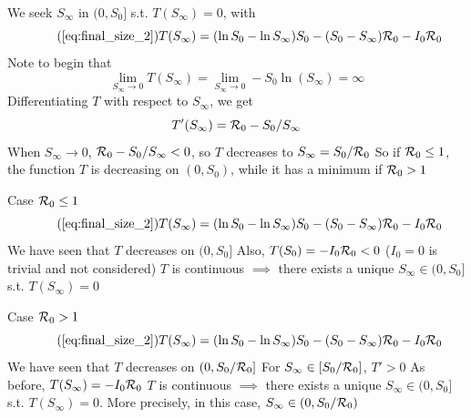 \documentclass[aspectratio=169]{beamer}\usepackage[]{graphicx}\usepackage[]{xcolor}
\begin{document}
\begin{frame}{}
  We seek $S_\infty$ in $(0,S_0]$ s.t. $T(S_\infty)=0$, with
  \begin{equation}\tag{\ref{eq:final_size_2}}
    T(S_\infty) =(\ln S_0-\ln S_\infty)S_0
    - (S_0-S_\infty)\R_0 -I_0\R_0      
  \end{equation}
  \vfill
  Note to begin that 
  $$
  \lim_{S_\infty\to 0}T(S_\infty)=\lim_{S_\infty\to 0}-S_0\ln(S_\infty)=\infty
  $$
  \vfill
  Differentiating $T$ with respect to $S_\infty$, we get 
  $$
  T'(S_\infty)=\mathcal{R}_0-S_0/S_\infty
  $$ 
  \vfill
  When $S_\infty\to 0$, $\mathcal{R}_0-S_0/S_\infty<0$, so $T$ decreases to $S_\infty=S_0/\mathcal{R}_0$
  \vfill
  So if $\mathcal{R}_0\leq 1$, the function $T$ is decreasing on $(0,S_0)$, while it has a minimum if $\mathcal{R}_0>1$
\end{frame}



\begin{frame}{Case $\mathcal{R}_0\leq 1$}
  \begin{equation}\tag{\ref{eq:final_size_2}}
    T(S_\infty) =(\ln S_0-\ln S_\infty)S_0
    - (S_0-S_\infty)\R_0 -I_0\R_0      
  \end{equation}
  \vfill
  \bbullet We have seen that $T$ decreases on $(0,S_0]$
  \vfill
  \bbullet Also, $T(S_0)=-I_0\mathcal{R}_0<0$ ($I_0=0$ is trivial and not considered)
  \vfill
  \bbullet $T$ is continuous
  \vfill
  $\implies$ there exists a unique $S_\infty\in (0,S_0]$ s.t. $T(S_\infty)=0$
\end{frame}


\begin{frame}{Case $\mathcal{R}_0> 1$}
  \begin{equation}\tag{\ref{eq:final_size_2}}
    T(S_\infty) =(\ln S_0-\ln S_\infty)S_0
    - (S_0-S_\infty)\R_0 -I_0\R_0      
  \end{equation}
  \vfill
  \bbullet We have seen that $T$ decreases on $(0,S_0/\mathcal{R}_0]$
  \vfill
  \bbullet For $S_\infty\in[S_0/\mathcal{R}_0]$, $T'>0$
  \vfill
  \bbullet As before, $T(S_\infty)=-I_0\mathcal{R}_0$
  \vfill
  \bbullet $T$ is continuous
  \vfill
  $\implies$ there exists a unique $S_\infty\in (0,S_0]$ s.t. $T(S_\infty)=0$. More precisely, in this case, $S_\infty\in(0,S_0/\mathcal{R}_0)$
\end{frame}
\end{document}
